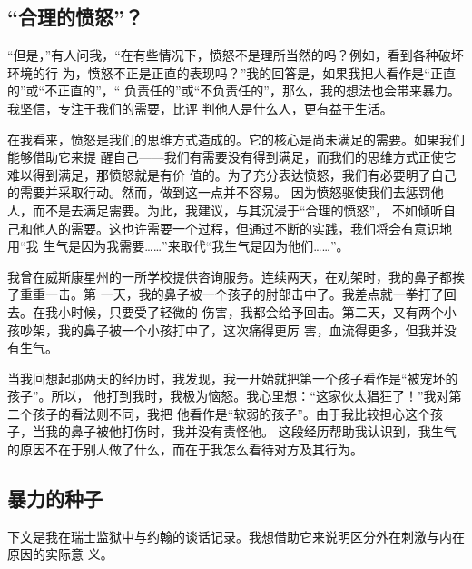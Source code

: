 \documentclass{ctexart}
\begin{document}
\subsection{``合理的愤怒''？}

``但是，''有人问我，``在有些情况下，愤怒不是理所当然的吗？例如，看到各种破坏环境的行
为，愤怒不正是正直的表现吗？''我的回答是，如果我把人看作是``正直的''或``不正直的''，``
负责任的''或``不负责任的''，那么，我的想法也会带来暴力。我坚信，专注于我们的需要，比评
判他人是什么人，更有益于生活。

在我看来，愤怒是我们的思维方式造成的。它的核心是尚未满足的需要。如果我们能够借助它来提
醒自己------我们有需要没有得到满足，而我们的思维方式正使它难以得到满足，那愤怒就是有价
值的。为了充分表达愤怒，我们有必要明了自己的需要并采取行动。然而，做到这一点并不容易。
因为愤怒驱使我们去惩罚他人，而不是去满足需要。为此，我建议，与其沉浸于``合理的愤怒''，
不如倾听自己和他人的需要。这也许需要一个过程，但通过不断的实践，我们将会有意识地用``我
生气是因为我需要\ldots\ldots''来取代``我生气是因为他们\ldots\ldots''。

我曾在威斯康星州的一所学校提供咨询服务。连续两天，在劝架时，我的鼻子都挨了重重一击。第
一天，我的鼻子被一个孩子的肘部击中了。我差点就一拳打了回去。在我小时候，只要受了轻微的
伤害，我都会给予回击。第二天，又有两个小孩吵架，我的鼻子被一个小孩打中了，这次痛得更厉
害，血流得更多，但我并没有生气。

当我回想起那两天的经历时，我发现，我一开始就把第一个孩子看作是``被宠坏的孩子''。所以，
他打到我时，我极为恼怒。我心里想：``这家伙太猖狂了！''我对第二个孩子的看法则不同，我把
他看作是``软弱的孩子''。由于我比较担心这个孩子，当我的鼻子被他打伤时，我并没有责怪他。
这段经历帮助我认识到，我生气的原因不在于别人做了什么，而在于我怎么看待对方及其行为。


\subsection{暴力的种子}

下文是我在瑞士监狱中与约翰的谈话记录。我想借助它来说明区分外在刺激与内在原因的实际意
义。
\end{document}
